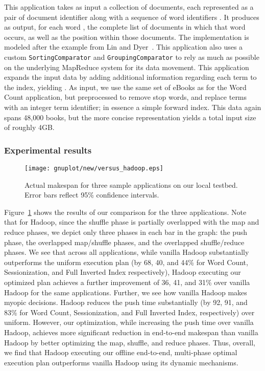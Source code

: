  This application takes as input a
collection of documents, each represented as a pair of document identifier 
along with a sequence of word identifiers .
It produces as output, for each word , the complete list of documents in
which that word occurs, as well as the position within those documents.
The implementation is modeled after the example from Lin and
Dyer~\cite{lin2010ditp}.
This application also uses a custom \verb=SortingComparator= and
\verb=GroupingComparator= to rely as much as possible on the underlying
MapReduce system for its data movement.
This application expands the input data by adding additional information
regarding each term to the index, yielding .
As input, we use the same set of eBooks as for the Word Count application, but
preprocessed to remove stop words, and replace terms with an integer term
identifier; in essence a simple forward index.
This data again spans 48,000 books, but the more concise representation yields
a total input size of roughly 4\unit{GB}.

\subsubsection{Experimental results}

\begin{figure}[htbp]
  \centering
  \texttt{[image: gnuplot/new/versus\_hadoop.eps]}
  \caption{Actual makespan for three sample applications on our local testbed.
  Error bars reflect 95\% confidence intervals.}
  \label{fig:versus_hadoop}
\end{figure}

Figure~\ref{fig:versus_hadoop} shows the results of our comparison for the
three applications.
Note that for Hadoop, since the shuffle phase is partially overlapped with the
map and reduce phases, we depict only three phases in each bar in the graph:
the push phase, the overlapped map/shuffle phases, and the overlapped
shuffle/reduce phases.
We see that across all applications, while vanilla Hadoop substantially
outperforms the uniform execution plan (by 68, 40, and 44\% for Word Count,
Sessionization, and Full Inverted Index respectively), Hadoop executing our
optimized plan achieves a further improvement of 36, 41, and 31\% over vanilla
Hadoop for the same applications.
Further, we see how vanilla Hadoop makes myopic decisions.
Hadoop reduces the push time substantially (by 92, 91, and 83\% for Word Count,
Sessionization, and Full Inverted Index, respectively) over uniform.
However, our optimization, while increasing the push time over vanilla Hadoop,
achieves more significant reduction in end-to-end makespan than vanilla Hadoop
by better optimizing the map, shuffle, and reduce phases.
Thus, overall, we find that Hadoop executing our offline end-to-end,
multi-phase optimal execution plan outperforms vanilla Hadoop using its dynamic
mechanisms.

